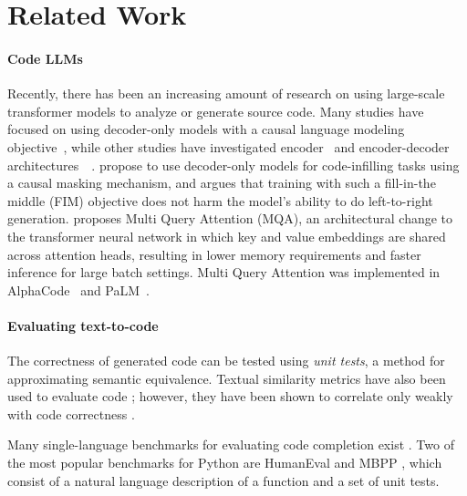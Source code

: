 \documentclass[10pt]{article} \usepackage{iclr2023_conference,times}
\begin{document}
\section{Related Work}

\paragraph{Code LLMs}
Recently, there has been an increasing amount of research on using large-scale transformer models to analyze or generate source code. Many studies have focused on using decoder-only models with a causal language modeling objective~\citep{chen2021codex,austin2021program,Nijkamp2022ACP,christopolou2022pangucoder,izadi2022codefill,xu2022systematicevaluation,mbxp}, while other studies have investigated encoder~\citep{feng-etal-2020-codebert,kanade2020embeddings} and encoder-decoder architectures~~\citep{li2022competition,ahmad-etal-2021-unified,wang-etal-2021-codet5,roziere2021dobf}. \citet{bavarian2022fim,fried2022incoder} propose to use decoder-only models for code-infilling tasks using a causal masking mechanism, and \citet{bavarian2022fim} argues that training with such a fill-in-the middle (FIM) objective does not harm the model's ability to do left-to-right generation. \citet{shazeer2019mqa} proposes Multi Query Attention (MQA), an architectural change to the transformer neural network in which key and value embeddings are shared across attention heads, resulting in lower memory requirements and faster inference for large batch settings. Multi Query Attention was implemented in AlphaCode~\citep{li2022competition} and PaLM~\citep{chowdhery2022palm}.  



\paragraph{Evaluating text-to-code}
The correctness of generated code can be tested using \textit{unit tests}, a method for approximating semantic equivalence. Textual similarity metrics have also been used to evaluate code \citep{feng2020codebert,ren2020codebleu}; however, they have been shown to correlate only weakly with code correctness \citep{austin2021program,chen2021codex}.

Many single-language benchmarks for evaluating code completion exist \citep{kulal2019spoc,iyer2018mapping,wikisql,spidersql,austin2021program,hendrycks2021measuring,chen2021codex,austin2021program,mbxp,Lai2022DS1000}. Two of the most popular benchmarks for Python are HumanEval \citep{chen2021codex} and MBPP \citep{austin2021program}, which consist of a natural language description of a function and a set of unit tests.
\end{document}
